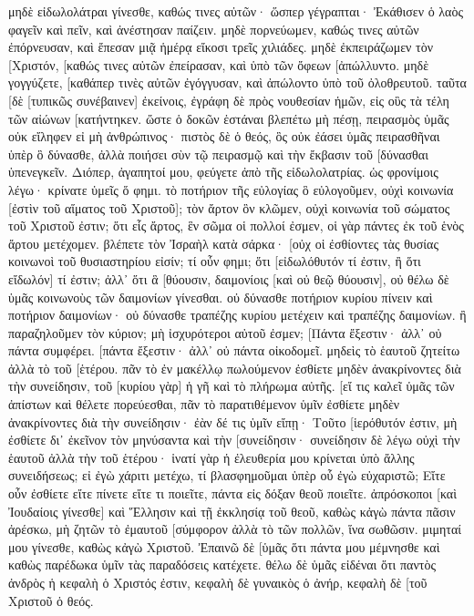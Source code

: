 μηδὲ εἰδωλολάτραι γίνεσθε, καθώς τινες αὐτῶν· ὥσπερ γέγραπται· Ἐκάθισεν ὁ λαὸς φαγεῖν καὶ πεῖν, καὶ ἀνέστησαν παίζειν. 
μηδὲ πορνεύωμεν, καθώς τινες αὐτῶν ἐπόρνευσαν, καὶ ἔπεσαν μιᾷ ἡμέρᾳ εἴκοσι τρεῖς χιλιάδες. 
μηδὲ ἐκπειράζωμεν τὸν [Χριστόν, [καθώς τινες αὐτῶν ἐπείρασαν, καὶ ὑπὸ τῶν ὄφεων [ἀπώλλυντο. 
μηδὲ γογγύζετε, [καθάπερ τινὲς αὐτῶν ἐγόγγυσαν, καὶ ἀπώλοντο ὑπὸ τοῦ ὀλοθρευτοῦ. 
ταῦτα [δὲ [τυπικῶς συνέβαινεν] ἐκείνοις, ἐγράφη δὲ πρὸς νουθεσίαν ἡμῶν, εἰς οὓς τὰ τέλη τῶν αἰώνων [κατήντηκεν. 
ὥστε ὁ δοκῶν ἑστάναι βλεπέτω μὴ πέσῃ, 
πειρασμὸς ὑμᾶς οὐκ εἴληφεν εἰ μὴ ἀνθρώπινος· πιστὸς δὲ ὁ θεός, ὃς οὐκ ἐάσει ὑμᾶς πειρασθῆναι ὑπὲρ ὃ δύνασθε, ἀλλὰ ποιήσει σὺν τῷ πειρασμῷ καὶ τὴν ἔκβασιν τοῦ [δύνασθαι ὑπενεγκεῖν. 
Διόπερ, ἀγαπητοί μου, φεύγετε ἀπὸ τῆς εἰδωλολατρίας. 
ὡς φρονίμοις λέγω· κρίνατε ὑμεῖς ὅ φημι. 
τὸ ποτήριον τῆς εὐλογίας ὃ εὐλογοῦμεν, οὐχὶ κοινωνία [ἐστὶν τοῦ αἵματος τοῦ Χριστοῦ]; τὸν ἄρτον ὃν κλῶμεν, οὐχὶ κοινωνία τοῦ σώματος τοῦ Χριστοῦ ἐστιν; 
ὅτι εἷς ἄρτος, ἓν σῶμα οἱ πολλοί ἐσμεν, οἱ γὰρ πάντες ἐκ τοῦ ἑνὸς ἄρτου μετέχομεν. 
βλέπετε τὸν Ἰσραὴλ κατὰ σάρκα· [οὐχ οἱ ἐσθίοντες τὰς θυσίας κοινωνοὶ τοῦ θυσιαστηρίου εἰσίν; 
τί οὖν φημι; ὅτι [εἰδωλόθυτόν τί ἐστιν, ἢ ὅτι εἴδωλόν] τί ἐστιν; 
ἀλλ᾽ ὅτι ἃ [θύουσιν, δαιμονίοις [καὶ οὐ θεῷ θύουσιν], οὐ θέλω δὲ ὑμᾶς κοινωνοὺς τῶν δαιμονίων γίνεσθαι. 
οὐ δύνασθε ποτήριον κυρίου πίνειν καὶ ποτήριον δαιμονίων· οὐ δύνασθε τραπέζης κυρίου μετέχειν καὶ τραπέζης δαιμονίων. 
ἢ παραζηλοῦμεν τὸν κύριον; μὴ ἰσχυρότεροι αὐτοῦ ἐσμεν; 
[Πάντα ἔξεστιν· ἀλλ᾽ οὐ πάντα συμφέρει. [πάντα ἔξεστιν· ἀλλ᾽ οὐ πάντα οἰκοδομεῖ. 
μηδεὶς τὸ ἑαυτοῦ ζητείτω ἀλλὰ τὸ τοῦ [ἑτέρου. 
πᾶν τὸ ἐν μακέλλῳ πωλούμενον ἐσθίετε μηδὲν ἀνακρίνοντες διὰ τὴν συνείδησιν, 
τοῦ [κυρίου γὰρ] ἡ γῆ καὶ τὸ πλήρωμα αὐτῆς. 
[εἴ τις καλεῖ ὑμᾶς τῶν ἀπίστων καὶ θέλετε πορεύεσθαι, πᾶν τὸ παρατιθέμενον ὑμῖν ἐσθίετε μηδὲν ἀνακρίνοντες διὰ τὴν συνείδησιν· 
ἐὰν δέ τις ὑμῖν εἴπῃ· Τοῦτο [ἱερόθυτόν ἐστιν, μὴ ἐσθίετε δι᾽ ἐκεῖνον τὸν μηνύσαντα καὶ τὴν [συνείδησιν· 
συνείδησιν δὲ λέγω οὐχὶ τὴν ἑαυτοῦ ἀλλὰ τὴν τοῦ ἑτέρου· ἱνατί γὰρ ἡ ἐλευθερία μου κρίνεται ὑπὸ ἄλλης συνειδήσεως; 
εἰ ἐγὼ χάριτι μετέχω, τί βλασφημοῦμαι ὑπὲρ οὗ ἐγὼ εὐχαριστῶ; 
Εἴτε οὖν ἐσθίετε εἴτε πίνετε εἴτε τι ποιεῖτε, πάντα εἰς δόξαν θεοῦ ποιεῖτε. 
ἀπρόσκοποι [καὶ Ἰουδαίοις γίνεσθε] καὶ Ἕλλησιν καὶ τῇ ἐκκλησίᾳ τοῦ θεοῦ, 
καθὼς κἀγὼ πάντα πᾶσιν ἀρέσκω, μὴ ζητῶν τὸ ἐμαυτοῦ [σύμφορον ἀλλὰ τὸ τῶν πολλῶν, ἵνα σωθῶσιν. 
μιμηταί μου γίνεσθε, καθὼς κἀγὼ Χριστοῦ. 
Ἐπαινῶ δὲ [ὑμᾶς ὅτι πάντα μου μέμνησθε καὶ καθὼς παρέδωκα ὑμῖν τὰς παραδόσεις κατέχετε. 
θέλω δὲ ὑμᾶς εἰδέναι ὅτι παντὸς ἀνδρὸς ἡ κεφαλὴ ὁ Χριστός ἐστιν, κεφαλὴ δὲ γυναικὸς ὁ ἀνήρ, κεφαλὴ δὲ [τοῦ Χριστοῦ ὁ θεός. 
